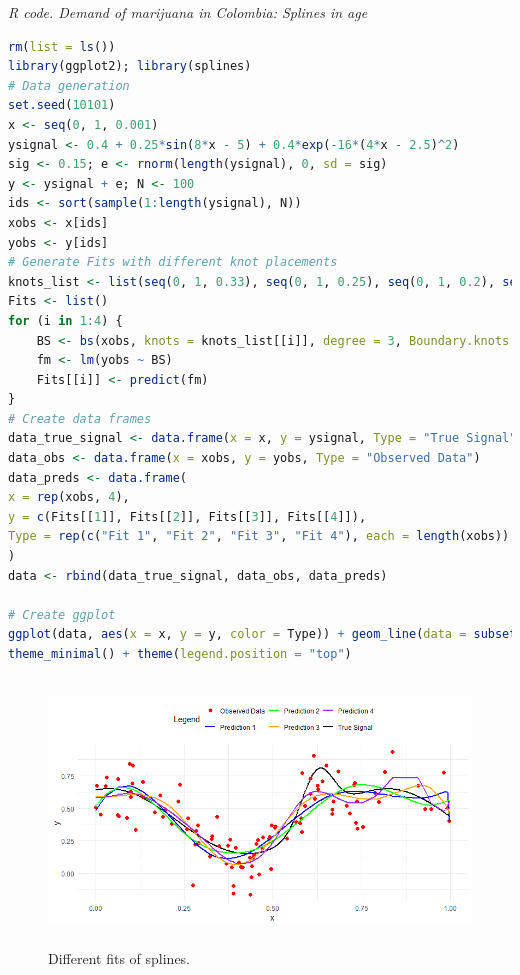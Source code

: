 \begin{tcolorbox}[enhanced,width=4.67in,center upper,
	fontupper=\large\bfseries,drop shadow southwest,sharp corners]
	\textit{R code. Demand of marijuana in Colombia: Splines in age}
	\begin{VF}
		\begin{lstlisting}[language=R]
rm(list = ls())
library(ggplot2); library(splines)
# Data generation
set.seed(10101)
x <- seq(0, 1, 0.001)
ysignal <- 0.4 + 0.25*sin(8*x - 5) + 0.4*exp(-16*(4*x - 2.5)^2)
sig <- 0.15; e <- rnorm(length(ysignal), 0, sd = sig)
y <- ysignal + e; N <- 100
ids <- sort(sample(1:length(ysignal), N))
xobs <- x[ids]
yobs <- y[ids]
# Generate Fits with different knot placements
knots_list <- list(seq(0, 1, 0.33), seq(0, 1, 0.25), seq(0, 1, 0.2), seq(0, 1, 0.1))
Fits <- list()
for (i in 1:4) {
	BS <- bs(xobs, knots = knots_list[[i]], degree = 3, Boundary.knots = range(x), intercept = FALSE)
	fm <- lm(yobs ~ BS)
	Fits[[i]] <- predict(fm)
}
# Create data frames
data_true_signal <- data.frame(x = x, y = ysignal, Type = "True Signal")
data_obs <- data.frame(x = xobs, y = yobs, Type = "Observed Data")
data_preds <- data.frame(
x = rep(xobs, 4),
y = c(Fits[[1]], Fits[[2]], Fits[[3]], Fits[[4]]),
Type = rep(c("Fit 1", "Fit 2", "Fit 3", "Fit 4"), each = length(xobs))
)
data <- rbind(data_true_signal, data_obs, data_preds)

# Create ggplot
ggplot(data, aes(x = x, y = y, color = Type)) + geom_line(data = subset(data, Type == "True Signal"), linewidth = 1) + geom_point(data = subset(data, Type == "Observed Data"), shape = 16, size = 2) + geom_line(data = subset(data, grepl("Fit", Type)), linewidth = 1, linetype = "solid") + scale_color_manual(values = c("True Signal" = "black", "Observed Data" = "red", "Fit 1" = "blue", "Fit 2" = "green", "Fit 3" = "orange", "Fit 4" = "purple")) + labs(y = "y", color = "Legend") +
theme_minimal() + theme(legend.position = "top")
\end{lstlisting}
	\end{VF}
\end{tcolorbox}

\begin{figure}[!h]
	\includegraphics[width=340pt, height=200pt]{Chapters/chapter11/figures/SplineFit.png}
	\caption[List of figure caption goes here]{Different fits of splines.}\label{figFitBsplines}
\end{figure}

